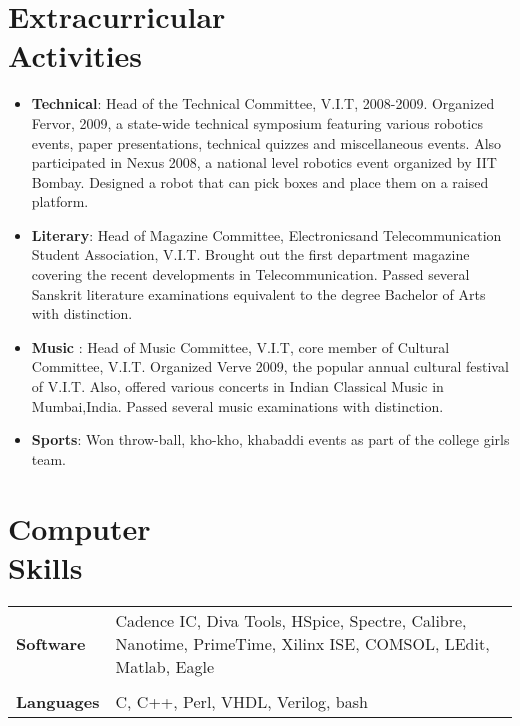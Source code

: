 \documentclass[margin]{res}
\begin{document}
\begin{resume}
\section{Extracurricular \\ Activities}
\begin{itemize}
\item
{\bf Technical}: Head of the Technical Committee, V.I.T, 2008-2009. Organized Fervor, 2009, a state-wide technical symposium featuring various robotics events, paper presentations, technical quizzes and miscellaneous events. Also participated in Nexus 2008, a national level robotics event organized by IIT Bombay. Designed a robot that can pick boxes and place them on a raised platform.
\item
{\bf Literary}: Head of Magazine Committee, Electronicsand Telecommunication Student Association, V.I.T. Brought out the first department 
magazine covering the recent developments in Telecommunication. Passed several Sanskrit literature examinations equivalent to the degree Bachelor of Arts with distinction.
\item
{\bf Music} : Head of Music Committee, V.I.T, core member of Cultural Committee, V.I.T. Organized Verve 2009, the popular annual cultural festival of V.I.T. Also, offered various concerts in Indian Classical Music in Mumbai,India. Passed several music examinations with distinction.
\item
{\bf Sports}: Won throw-ball, kho-kho, khabaddi events as part of the college girls team.
\end{itemize}
\section{Computer \\ Skills}
   \begin{tabular}{l p{3.5in}}
        {\bf Software} &  Cadence IC, Diva Tools, HSpice, Spectre, Calibre, Nanotime, PrimeTime, Xilinx ISE, COMSOL, LEdit, Matlab, Eagle \\\\
    {\bf Languages} & C, C++, Perl, VHDL, Verilog, bash
 \end{tabular}


\end{resume} 
\end{document}
